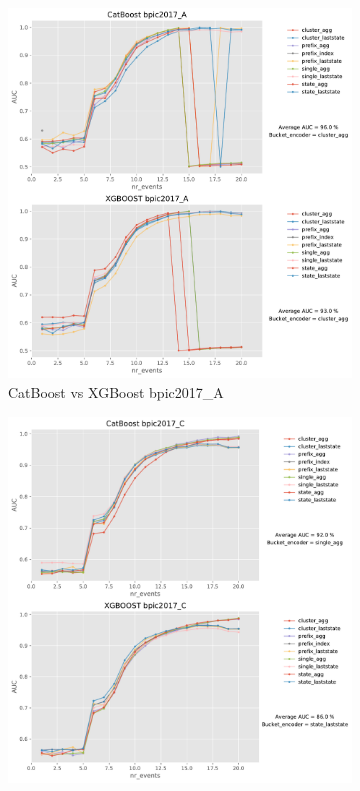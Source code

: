 \begin{figure}[!htb]
	\begin{subfigure}{0.48\textwidth}
		\includegraphics[width=\linewidth]{images/catboost/graphs/bpic2017_A_CatBoost_xgboost.pdf}
		\caption{CatBoost vs XGBoost bpic2017\_A} \label{fig:b17a}
	\end{subfigure}\hspace*{\fill}
	\begin{subfigure}{0.48\textwidth}
		\includegraphics[width=\linewidth]{images/catboost/graphs/bpic2017_C_CatBoost_xgboost.pdf}

\end{subfigure}
\end{figure}
